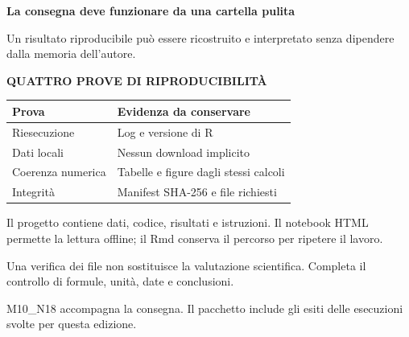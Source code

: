 \documentclass[12pt,aspectratio=1610]{beamer}
\newcommand{\PLabel}[1]{\par{\color{Classical}\bfseries\fontsize{9}{11}\selectfont\MakeUppercase{#1}}\par\vspace{1.8mm}}
\newcommand{\PBody}[1]{\par{\fontsize{11.3}{14.8}\selectfont #1\par}}
\newcommand{\PSmall}[1]{\par{\fontsize{9.8}{13.1}\selectfont #1\par}}
\newcommand{\PInfo}[1]{%
\begin{tcolorbox}[enhanced,arc=1.6mm,boxrule=.55pt,colback=GeoTint,
 colframe=Rule!80!Classical,left=2.3mm,right=2.3mm,top=2mm,bottom=2mm,
 before skip=1mm,after skip=1mm]
\PSmall{#1}\end{tcolorbox}}
\begin{document}
\begin{frame}[plain]\hypertarget{slide108}{}
\begin{lrbox}{\TitleBox}
\begin{minipage}[t]{17.7cm}\raggedright\color{Ink}\fontsize{11.3}{14.8}\selectfont
\color{Navy}\bfseries\fontsize{20.6}{24.5}\selectfont La consegna deve funzionare da una cartella pulita
\end{minipage}\end{lrbox}

\begin{lrbox}{\RecallBox}
\begin{minipage}[t]{14.3cm}\raggedright\color{Ink}\fontsize{11.3}{14.8}\selectfont
\fontsize{10.3}{13.8}\selectfont Un risultato riproducibile può essere ricostruito e interpretato senza dipendere dalla memoria dell’autore.
\end{minipage}\end{lrbox}

\begin{lrbox}{\PilotLeftBox}
\begin{minipage}[t]{10.05cm}\raggedright\color{Ink}\fontsize{11.3}{14.8}\selectfont
\PLabel{Quattro prove di riproducibilità}
{\fontsize{10.2}{13.1}\selectfont\renewcommand{\arraystretch}{1.45}\begin{tabular}{@{}p{3.4cm}p{5.7cm}@{}}\toprule
\textbf{Prova} & \textbf{Evidenza da conservare}\\\midrule
Riesecuzione & Log e versione di R\\
Dati locali & Nessun download implicito\\
Coerenza numerica & Tabelle e figure dagli stessi calcoli\\
Integrità & Manifest SHA-256 e file richiesti\\
\bottomrule\end{tabular}}

\end{minipage}\end{lrbox}

\begin{lrbox}{\PilotRightBox}
\begin{minipage}[t]{7.55cm}\raggedright\color{Ink}\fontsize{11.3}{14.8}\selectfont
\PBody{Il progetto contiene dati, codice, risultati e istruzioni. Il notebook HTML permette la lettura offline; il Rmd conserva il percorso per ripetere il lavoro.}
\vspace{2.5mm}
\PInfo{Una verifica dei file non sostituisce la valutazione scientifica. Completa il controllo di formule, unità, date e conclusioni.}
\PSmall{M10\_N18 accompagna la consegna. Il pacchetto include gli esiti delle esecuzioni svolte per questa edizione.}


\end{minipage}
\end{lrbox}
\end{frame}
\end{document}
